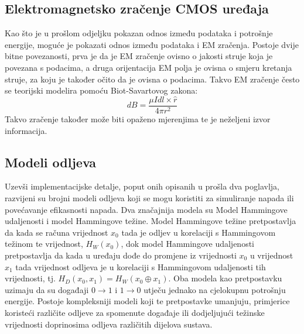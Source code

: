\documentclass[times, utf8, diplomski]{fer}
\begin{document}
\subsection{Elektromagnetsko zračenje CMOS uređaja}
Kao što je u prošlom odjeljku pokazan odnos između podataka i potrošnje energije, moguće je pokazati odnos između podataka i EM zračenja. Postoje dvije bitne povezanosti, prva je da je EM zračenje ovisno o jakosti struje koja je povezana s podacima, a druga orijentacija EM polja je ovisna o smjeru kretanja struje, za koju je također očito da je ovisna o podacima. Takvo EM zračenje često se teorijski modelira pomoću Biot-Savartovog zakona:
\begin{equation}
    dB = \frac{\mu I dl \times \hat{r}}{4 \pi r^2}
\end{equation}
Takvo zračenje također može biti opaženo mjerenjima te je neželjeni izvor informacija.

\subsection{Modeli odljeva}

Uzevši implementacijske detalje, poput onih opisanih u prošla dva poglavlja, razvijeni su brojni modeli odljeva koji se mogu koristiti za simuliranje napada ili povećavanje efikasnosti napada. Dva značajnija modela su Model Hammingove udaljenosti i model Hammingove težine. Model Hammingove težine pretpostavlja da kada se računa vrijednost \(x_0\) tada je odljev u korelaciji s Hammingovom težinom te vrijednost, \(H_W(x_0)\), dok model Hammingove udaljenosti pretpostavlja da kada u uređaju dođe do promjene iz vrijednosti \(x_0\) u vrijednost \(x_1\) tada vrijednost odljeva je u korelaciji s Hammingovom udaljenosti tih vrijednosti, tj. \(H_D(x_0, x_1) = H_W(x_0 \oplus x_1)\). Oba modela kao pretpostavku uzimaju da su događaji \(0 \rightarrow 1\) i \(1 \rightarrow 0\) utječu jednako na cjelokupnu potrošnju energije. Postoje kompleksniji modeli koji te pretpostavke umanjuju, primjerice koristeći različite odljeve za spomenute događaje ili dodjeljujući težinske vrijednosti doprinosima odljeva različitih dijelova sustava.
\end{document}
